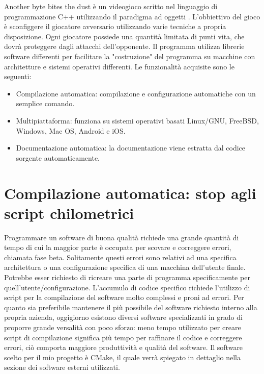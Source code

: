 Another byte bites the dust è un videogioco scritto nel linguaggio di programmazione C++ utilizzando il paradigma ad oggetti .
L'obbiettivo del gioco è sconfiggere il giocatore avversario utilizzando varie tecniche a propria disposizione. Ogni giocatore possiede una quantità limitata di punti vita, che dovrà proteggere dagli attacchi dell'opponente.
Il programma utilizza librerie software differenti per facilitare la "costruzione" del programma su macchine con architetture e sistemi operativi differenti.
Le funzionalità acquisite sono le seguenti:
\begin{itemize}
  \item Compilazione automatica: compilazione e configurazione automatiche con un semplice comando.
  \item Multipiattaforma: funziona su sistemi operativi basati Linux/GNU, FreeBSD, Windows, Mac OS, Android e iOS.
  \item Documentazione automatica: la documentazione viene estratta dal codice sorgente automaticamente.
\end{itemize}
\section{Compilazione automatica: stop agli script chilometrici}
Programmare un software di buona qualità richiede una grande quantità di tempo di cui la maggior parte è occupata per scovare e correggere errori, chiamata fase beta. Solitamente questi errori sono relativi ad una specifica architettura o una configurazione specifica di una macchina dell'utente finale. Potrebbe esser richiesto di ricreare una parte di programma specificamente per quell'utente/configurazione. L'accumulo di codice specifico richiede l'utilizzo di script per la compilazione del software molto complessi e proni ad errori. Per quanto sia preferibile mantenere il più possibile del software richiesto interno alla propria azienda, oggigiorno esistono diversi software specializzati in grado di proporre grande versalità con poco sforzo: meno tempo utilizzato per creare script di compilazione significa più tempo per raffinare il codice e correggere errori, ciò comporta maggiore produttività e qualità del software.
Il software scelto per il mio progetto è CMake, il quale verrà spiegato in dettaglio nella sezione dei software esterni utilizzati.
